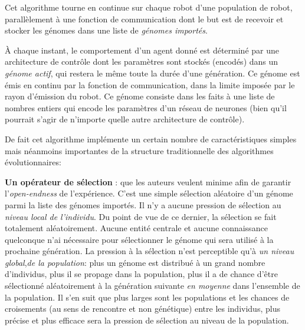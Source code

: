 Cet algorithme tourne en continue sur chaque robot d'une population de robot, parallèlement à une fonction de communication dont le but est de recevoir et stocker les génomes dans une liste de \emph{génomes importés}.

À chaque instant, le comportement d'un agent donné est déterminé par une architecture de contrôle dont les paramètres sont stockés (encodés) dans un \emph{génome actif}, qui restera le même toute la durée d'une génération. Ce génome est émis en continu par la fonction de communication, dans la limite imposée par le rayon d'émission du robot. Ce génome consiste dans les faits à une liste de nombres entiers qui encode les paramètres d'un réseau de neurones (bien qu'il pourrait s'agir de n'importe quelle autre architecture de contrôle).

De fait cet algorithme implémente un certain nombre de caractéristiques simples mais néanmoins importantes de la structure traditionnelle des algorithmes évolutionnaires:

\textbf{Un opérateur de sélection }: que les auteurs veulent minime afin de garantir l'\emph{open-endness} de l'expérience. C'est une simple sélection aléatoire d'un génome parmi la liste des génomes importés. Il n'y a aucune pression de sélection au \emph{niveau local de l'individu}. Du point de vue de ce dernier, la sélection se fait totalement aléatoirement. Aucune entité centrale et aucune connaissance quelconque n'ai nécessaire pour sélectionner le génome qui sera utilisé à la prochaine génération. La pression à la sélection n'est perceptible qu'à \emph{un niveau global},\emph{de la population}: plus un génome est distribué à un grand nombre d'individus, plus il se propage dans la population, plus il a de chance d'être sélectionné aléatoirement à la génération suivante \emph{en moyenne} dans l'ensemble de la population. Il s'en suit que plus larges sont les populations et les chances de croisements (au sens de rencontre et non génétique) entre les individus, plus précise et plus efficace sera la pression de sélection au niveau de la population.

